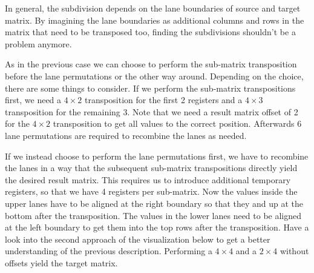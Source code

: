 In general, the subdivision depends on the lane boundaries of source and target matrix.
By imagining the lane boundaries as additional columns and rows in the matrix that need to be transposed too, finding the subdivisions shouldn't be a problem anymore.

As in the previous case we can choose to perform the sub-matrix transposition before the lane permutations or the other way around.
Depending on the choice, there are some things to consider.
If we perform the sub-matrix transpositions first, we need a $4 \times 2$ transposition for the first 2 registers and a $4 \times 3$ transposition for the remaining 3.
Note that we need a result matrix offset of 2 for the $4 \times 2$ transposition to get all values to the correct position.
Afterwards 6 lane permutations are required to recombine the lanes as needed.

If we instead choose to perform the lane permutations first, we have to recombine the lanes in a way that the subsequent sub-matrix transpositions directly yield the desired result matrix.
This requires us to introduce additional temporary registers, so that we have 4 registers per sub-matrix.
Now the values inside the upper lanes have to be aligned at the right boundary so that they and up at the bottom after the transposition.
The values in the lower lanes need to be aligned at the left boundary to get them into the top rows after the transposition.
Have a look into the second approach of the visualization below to get a better understanding of the previous description.
Performing a $4 \times 4$ and a $2 \times 4$ without offsets yield the target matrix.



